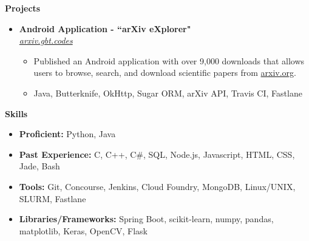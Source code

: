 \documentclass[letterpaper,10pt]{article}
\newcommand{\resitem}[1]{\item #1 \vspace{-2pt}}
\newcommand{\resheading}[1]{{\large \colorbox{mygrey}{\begin{minipage}{\textwidth}{\textbf{#1 \vphantom{p\^{E}}}}\end{minipage}}}}
\newcommand{\ressubheading}[4]{%
  \item\textbf{#1} \hfill #2\null\\
  \textit{#3} \hfill \textit{#4}%
  \vspace{-5pt}
}%
\begin{document}
\resheading{Projects}
\begin{itemize}

\ressubheading{Android Application - ``arXiv eXplorer"}{}{\href{http://arxiv.gbt.codes}{arxiv.gbt.codes}}{}
	\begin{itemize}
		\resitem{Published an Android application with over 9,000 downloads that allows users to browse, search, and download scientific papers from \href{http://arxiv.org}{arxiv.org}.}
		\resitem{Java, Butterknife, OkHttp, Sugar ORM, arXiv API, Travis CI, Fastlane}
	\end{itemize}
	





\end{itemize}

\resheading{Skills}
	\begin{itemize}
	\resitem{\textbf{Proficient:} Python, Java}
	\resitem{\textbf{Past Experience:} C, C++, C\#, SQL, Node.js, Javascript, HTML, CSS, Jade, Bash}
	\resitem{\textbf{Tools:} Git, Concourse, Jenkins, Cloud Foundry, MongoDB, Linux/UNIX, SLURM, Fastlane}
	\resitem{\textbf{Libraries/Frameworks:} Spring Boot, scikit-learn, numpy, pandas, matplotlib, Keras, OpenCV, Flask}
	\end{itemize}
\end{document}
